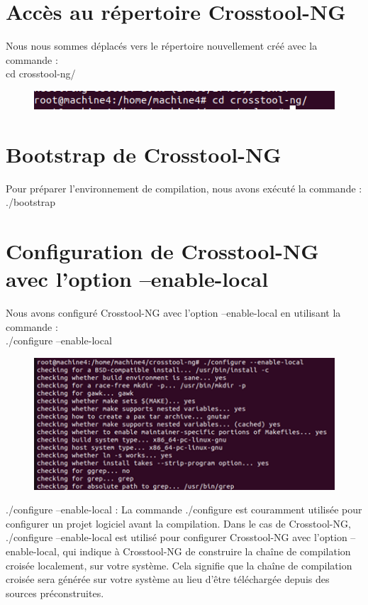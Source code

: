 \section{Accès au répertoire Crosstool-NG }
Nous nous sommes déplacés vers le répertoire nouvellement créé avec la commande :
\\cd crosstool-ng/ 
\begin{figure}[h]
    \centering
    \includegraphics[width=1\textwidth]{images/9.png}
    
\end{figure}

\section{Bootstrap de Crosstool-NG }
Pour préparer l'environnement de compilation, nous avons exécuté la commande :
\\ ./bootstrap 
\section{Configuration de Crosstool-NG avec l'option --enable-local }
Nous avons configuré Crosstool-NG avec l'option --enable-local en utilisant la commande :
\\ ./configure --enable-local 
\begin{figure}[h]
    
    \includegraphics[width=1\textwidth]{images/10.png}   
\end{figure}
./configure --enable-local : La commande ./configure est couramment utilisée pour configurer un projet logiciel avant la compilation. Dans le cas de Crosstool-NG, ./configure --enable-local est utilisé pour configurer Crosstool-NG avec l'option --enable-local, qui indique à Crosstool-NG de construire la chaîne de compilation croisée localement, sur votre système. Cela signifie que la chaîne de compilation croisée sera générée sur votre système au lieu d'être téléchargée depuis des sources préconstruites.

